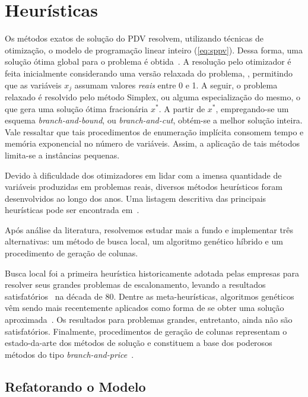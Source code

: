 \zerar
\chapter{Heurísticas}
\label{cap:heuristicas}

Os métodos exatos de solução do PDV resolvem, utilizando técnicas de otimização, o modelo de
programação linear inteiro (\ref{eq:sppv}). Dessa forma, uma solução ótima global para o problema é
obtida~\cite{anbil91b}. A resolução pelo otimizador é feita inicialmente considerando uma versão
relaxada do problema, \ie, permitindo que as variáveis $x_j$ assumam valores {\it reais} entre 0 e
1. A seguir, o problema relaxado é resolvido pelo método Simplex, ou alguma especialização do mesmo,
o que gera uma solução ótima fracionária $x^\ast$. A partir de $x^\ast$, empregando-se um esquema
{\it branch-and-bound}, ou {\it branch-and-cut}, obtém-se a melhor solução inteira. Vale ressaltar
que tais procedimentos de enumeração implícita consomem tempo e memória exponencial no número de
variáveis. Assim, a aplicação de tais métodos limita-se a instâncias pequenas.

Devido à dificuldade dos otimizadores em lidar com a imensa quantidade de variáveis produzidas em
problemas reais, diversos métodos heurísticos foram desenvolvidos ao longo dos anos. Uma listagem
descritiva das principais heurísticas pode ser encontrada em~\cite{gopalakrishnan05}.

Após análise da literatura, resolvemos estudar mais a fundo e implementar três alternativas: um
método de busca local, um algoritmo genético híbrido e um procedimento de geração de colunas. 

Busca local foi a primeira heurística historicamente adotada pelas empresas para resolver seus
grandes problemas de escalonamento, levando a resultados satisfatórios~\cite{gershkoff89} na década
de 80. Dentre as meta-heurísticas, algoritmos genéticos vêm sendo mais recentemente aplicados como
forma de se obter uma solução aproximada~\cite{kornilakis02}. Os resultados para problemas grandes,
entretanto, ainda não são satisfatórios. Finalmente, procedimentos de geração de colunas representam
o estado-da-arte dos métodos de solução e constituem a base dos poderosos métodos do tipo {\it
branch-and-price}~\cite{vance97}.


\section{Refatorando o Modelo}
\label{sec:refatorando}

